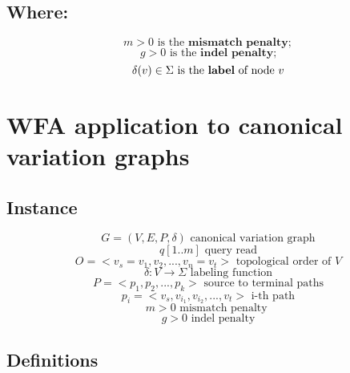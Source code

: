 \documentclass{article}
\begin{document}
    \subsection{Where:}
    $$m > 0 \text{ is the } \textbf{mismatch penalty};$$
    $$g > 0 \text{ is the } \textbf{indel penalty;}$$
    $$\delta(v) \in \Sigma \text{ is the \textbf{label} of node } v$$

\section{WFA application to canonical variation graphs}
\subsection{Instance} 
    $$G = (V, E, P, \delta) \text{ canonical variation graph}$$
    $$q[1..m] \text{ query read}$$
    $$O = <v_s=v_1, v_2, ..., v_n=v_t> \text{ topological order of } V$$
    $$\delta : V \rightarrow \Sigma \text{ labeling function}$$
    $$P = <p_1, p_2, ..., p_k> \text{ source to terminal paths}$$
    $$p_i = <v_s, v_{i_1}, v_{i_2}, ..., v_t> \text{ i-th path}$$ 
    $$m > 0 \text{ mismatch penalty }$$
    $$g > 0 \text{ indel penalty}$$

\subsection{Definitions}
\end{document}

